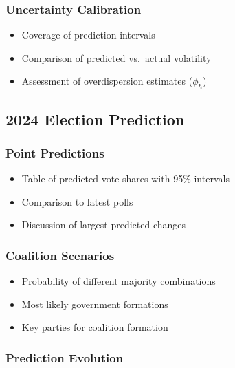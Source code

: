 \documentclass[
  letterpaper,
  DIV=11,
  numbers=noendperiod]{scrartcl}
\providecommand{\tightlist}{%
  \setlength{\itemsep}{0pt}\setlength{\parskip}{0pt}}\usepackage{longtable,booktabs,array}
\begin{document}
\subsubsection{Uncertainty Calibration}\label{uncertainty-calibration}

\begin{itemize}
\tightlist
\item
  Coverage of prediction intervals
\item
  Comparison of predicted vs.~actual volatility
\item
  Assessment of overdispersion estimates (\(\phi_h\))
\end{itemize}

\subsection{2024 Election Prediction}\label{election-prediction}

\subsubsection{Point Predictions}\label{point-predictions}

\begin{itemize}
\tightlist
\item
  Table of predicted vote shares with 95\% intervals
\item
  Comparison to latest polls
\item
  Discussion of largest predicted changes
\end{itemize}

\subsubsection{Coalition Scenarios}\label{coalition-scenarios}

\begin{itemize}
\tightlist
\item
  Probability of different majority combinations
\item
  Most likely government formations
\item
  Key parties for coalition formation
\end{itemize}

\subsubsection{Prediction Evolution}\label{prediction-evolution}
\end{document}
